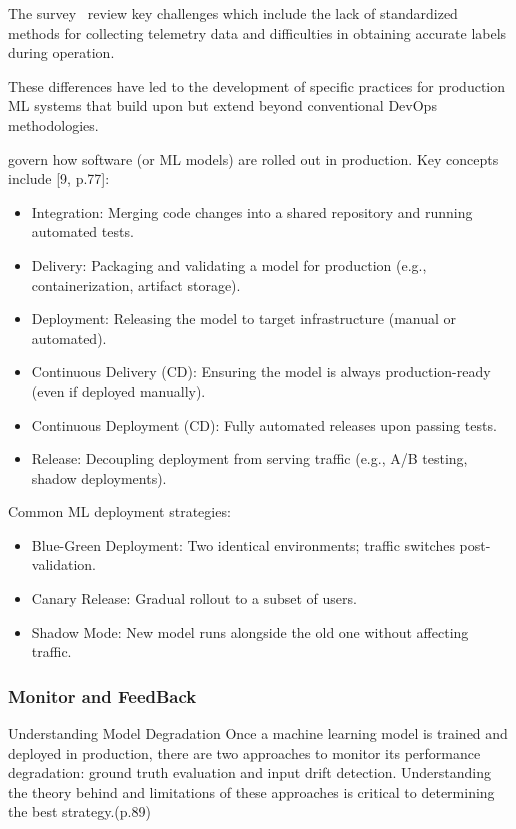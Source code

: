 The survey~\cite{10.1145/3533378} review key challenges which include the lack of standardized methods for collecting telemetry data and difficulties in obtaining accurate labels during operation.

These differences have led to the development of specific practices for production ML systems that build upon but extend beyond conventional DevOps methodologies\cite{gift2021practical,10.1145/3533378}.


\label{subsec:deployment-strategies}
govern how software (or ML models) are rolled out in production.
Key concepts include [9, p.77]:

\begin{itemize}
    \item Integration: Merging code changes into a shared repository and running automated tests.
    \item Delivery: Packaging and validating a model for production (e.g., containerization, artifact storage).
    \item Deployment: Releasing the model to target infrastructure (manual or automated).
    \item Continuous Delivery (CD): Ensuring the model is always production-ready (even if deployed manually).
    \item Continuous Deployment (CD): Fully automated releases upon passing tests.
    \item Release: Decoupling deployment from serving traffic (e.g., A/B testing, shadow deployments).
\end{itemize}
Common ML deployment strategies\cite{gift2021practical}:
\begin{itemize}
    \item Blue-Green Deployment: Two identical environments; traffic switches post-validation.
    \item Canary Release: Gradual rollout to a subset of users.
    \item Shadow Mode: New model runs alongside the old one without affecting traffic.
\end{itemize}


\subsubsection{Monitor and FeedBack}

Understanding Model Degradation
Once a machine learning model is trained and deployed in production, there are two
approaches to monitor its performance degradation: ground truth evaluation and
input drift detection.
Understanding the theory behind and limitations of these
approaches is critical to determining the best strategy.\cite{treveil2020introducing}(p.89)

